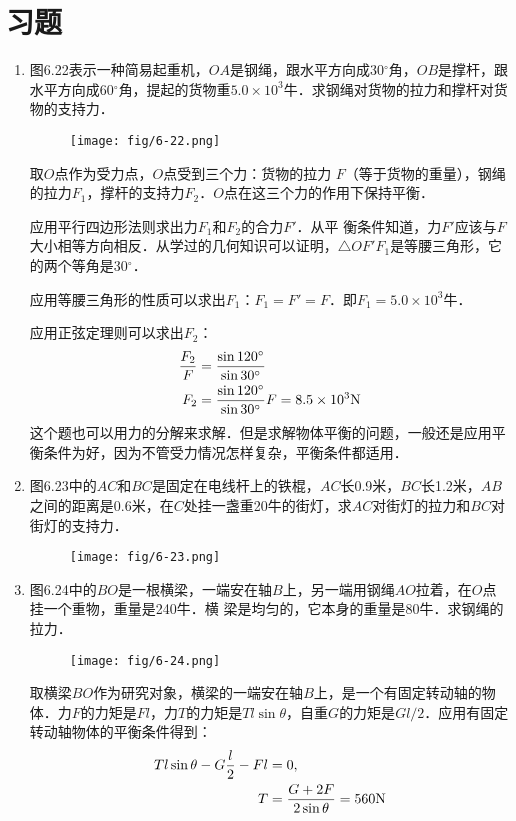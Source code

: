\section*{习题}
\begin{enumerate}
    \item 图6.22表示一种简易起重机，$OA$是钢绳，跟水平方向成30$^\circ$角，$OB$是撑杆，跟水平方向成60$^\circ$角，提起的货物重$5.0\times 10^3$牛．求钢绳对货物的拉力和撑杆对货物的支持力．
\begin{figure}[htp]
\centering\texttt{[image: fig/6-22.png]}
\caption{}
\end{figure}

\begin{solution}
取$O$点作为受力点，$O$点受到三个力：货物的拉力
$F$（等于货物的重量），钢绳的拉力$F_1$，撑杆的支持力$F_2$．$O$点在这三个力的作用下保持平衡．

应用平行四边形法则求出力$F_1$和$F_2$的合力$F'$．从平
衡条件知道，力$F'$应该与$F$大小相等方向相反．从学过的几何知识可以证明，$\triangle OF'F_1$是等腰三角形，它的两个等角是30$^\circ$．

应用等腰三角形的性质可以求出$F_1$：$F_1=F'=F$．即$F_1=5.0\times 10^3$牛．

应用正弦定理则可以求出$F_2$：
\[\begin{split}
\frac{F_2}{F}&=\frac{\sin 120^{\circ}}{\sin 30^{\circ}}\\
F_2&=\frac{\sin 120^{\circ}}{\sin 30^{\circ}}F=8.5\times 10^3 {\rm N}
\end{split}\]
这个题也可以用力的分解来求解．但是求解物体平衡的问题，一般还是应用平衡条件为好，因为不管受力情况怎样复杂，平衡条件都适用．
\end{solution}

\item 图6.23中的$AC$和$BC$是固定在电线杆上的铁棍，$AC$长0.9米，$BC$长1.2米，$AB$之间的距离是0.6米，在$C$处挂一盏重20牛的街灯，求$AC$对街灯的拉力和$BC$对街灯的支持力．
\begin{figure}[htp]
\centering\texttt{[image: fig/6-23.png]}
\caption{}
\end{figure}
\item 图6.24中的$BO$是一根横梁，一端安在轴$B$上，另一端用钢绳$AO$拉着，在$O$点挂一个重物，重量是240牛．横
梁是均匀的，它本身的重量是80牛．求钢绳的拉力．
\begin{figure}[htp]
\centering\texttt{[image: fig/6-24.png]}
\caption{}
\end{figure}
\begin{solution}
    取横梁$BO$作为研究对象，横梁的一端安在轴$B$上，是一个有固定转动轴的物体．力$F$的力矩是$Fl$，力$T$的力矩是$Tl\sin\theta$，自重$G$的力矩是$Gl/2$．应用有固定转动轴物体的平衡条件得到：
\[\begin{split}
    Tl\sin\theta -G\frac{l}{2}-Fl&=0,\\
T&= \frac{G+2F}{2\sin\theta }=560{\rm N}
\end{split} \]


\end{solution}
\end{enumerate}
